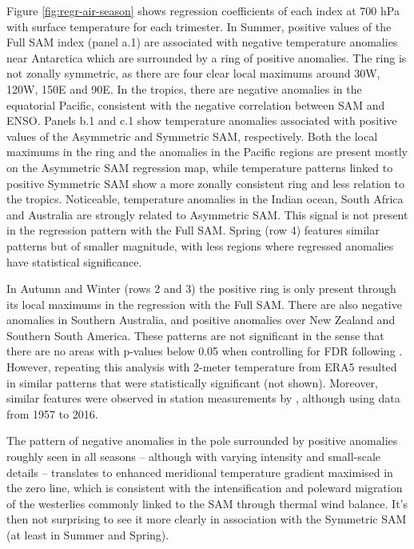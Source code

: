\documentclass[smallextended]{svjour3}       %
\begin{document}
Figure \ref{fig:regr-air-season} shows regression coefficients of each index at 700 hPa with surface temperature for each trimester. In Summer, positive values of the Full SAM index (panel a.1) are associated with negative temperature anomalies near Antarctica which are surrounded by a ring of positive anomalies. The ring is not zonally symmetric, as there are four clear local maximums around 30\degree W, 120\degree W, 150\degree E and 90\degree E. In the tropics, there are negative anomalies in the equatorial Pacific, consistent with the negative correlation between SAM and ENSO. Panels b.1 and c.1 show temperature anomalies associated with positive values of the Asymmetric and Symmetric SAM, respectively. Both the local maximums in the ring and the anomalies in the Pacific regions are present mostly on the Asymmetric SAM regression map, while temperature patterns linked to positive Symmetric SAM show a more zonally consistent ring and less relation to the tropics. Noticeable, temperature anomalies in the Indian ocean, South Africa and Australia are strongly related to Asymmetric SAM. This signal is not present in the regression pattern with the Full SAM. Spring (row 4) features similar patterns but of smaller magnitude, with less regions where regressed anomalies have statistical significance.

In Autumn and Winter (rows 2 and 3) the positive ring is only present through its local maximums in the regression with the Full SAM. There are also negative anomalies in Southern Australia, and positive anomalies over New Zealand and Southern South America. These patterns are not significant in the sense that there are no areas with p-values below 0.05 when controlling for FDR following \citet{wilks2016}. However, repeating this analysis with 2-meter temperature from ERA5 resulted in similar patterns that were statistically significant (not shown). Moreover, similar features were observed in station measurements by \citet{jones2019}, although using data from 1957 to 2016.

The pattern of negative anomalies in the pole surrounded by positive anomalies roughly seen in all seasons -- although with varying intensity and small-scale details -- translates to enhanced meridional temperature gradient maximised in the zero line, which is consistent with the intensification and poleward migration of the westerlies commonly linked to the SAM through thermal wind balance. It's then not surprising to see it more clearly in association with the Symmetric SAM (at least in Summer and Spring).
\end{document}
